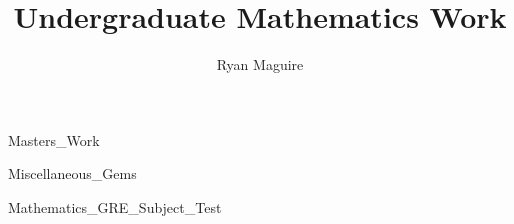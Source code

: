 \documentclass[crop=false,class=book,oneside]{standalone}
\begin{document}
    \newif\ifundergraduatemathematicswork
    \ifx\ifwork\undefined
        \title{Undergraduate Mathematics Work}
        \author{Ryan Maguire}
        \date{\vspace{-5ex}}
        \maketitle
        \tableofcontents
        \listoffigures
        \listoftables
        \clearpage
    \fi
        {Masters_Work}
        
                  {Miscellaneous_Gems}
        
                  {Mathematics_GRE_Subject_Test}
\end{document}

